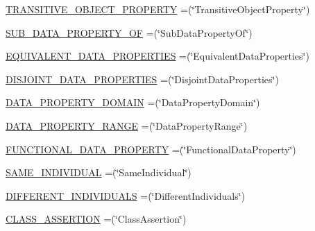 \begin{DoxyCompactItemize}
\item 
\hyperlink{enumorg_1_1semanticweb_1_1owlapi_1_1vocab_1_1_o_w_l_x_m_l_vocabulary_a2c41d3b22186357fbcd0229d60c0757b}{T\-R\-A\-N\-S\-I\-T\-I\-V\-E\-\_\-\-O\-B\-J\-E\-C\-T\-\_\-\-P\-R\-O\-P\-E\-R\-T\-Y} =(\char`\"{}Transitive\-Object\-Property\char`\"{})
\item 
\hyperlink{enumorg_1_1semanticweb_1_1owlapi_1_1vocab_1_1_o_w_l_x_m_l_vocabulary_a56ee089c75f10ee6b5b2cfedaa2bd508}{S\-U\-B\-\_\-\-D\-A\-T\-A\-\_\-\-P\-R\-O\-P\-E\-R\-T\-Y\-\_\-\-O\-F} =(\char`\"{}Sub\-Data\-Property\-Of\char`\"{})
\item 
\hyperlink{enumorg_1_1semanticweb_1_1owlapi_1_1vocab_1_1_o_w_l_x_m_l_vocabulary_a0b9029905e865207bd02f688fa38fe1b}{E\-Q\-U\-I\-V\-A\-L\-E\-N\-T\-\_\-\-D\-A\-T\-A\-\_\-\-P\-R\-O\-P\-E\-R\-T\-I\-E\-S} =(\char`\"{}Equivalent\-Data\-Properties\char`\"{})
\item 
\hyperlink{enumorg_1_1semanticweb_1_1owlapi_1_1vocab_1_1_o_w_l_x_m_l_vocabulary_a4c2e743ee1e358a0637e1cd8c3cdcd6f}{D\-I\-S\-J\-O\-I\-N\-T\-\_\-\-D\-A\-T\-A\-\_\-\-P\-R\-O\-P\-E\-R\-T\-I\-E\-S} =(\char`\"{}Disjoint\-Data\-Properties\char`\"{})
\item 
\hyperlink{enumorg_1_1semanticweb_1_1owlapi_1_1vocab_1_1_o_w_l_x_m_l_vocabulary_ad77199b5254ec7e6544e4acb75e96996}{D\-A\-T\-A\-\_\-\-P\-R\-O\-P\-E\-R\-T\-Y\-\_\-\-D\-O\-M\-A\-I\-N} =(\char`\"{}Data\-Property\-Domain\char`\"{})
\item 
\hyperlink{enumorg_1_1semanticweb_1_1owlapi_1_1vocab_1_1_o_w_l_x_m_l_vocabulary_a598a5ed924559b0e0123271ff14cc4b5}{D\-A\-T\-A\-\_\-\-P\-R\-O\-P\-E\-R\-T\-Y\-\_\-\-R\-A\-N\-G\-E} =(\char`\"{}Data\-Property\-Range\char`\"{})
\item 
\hyperlink{enumorg_1_1semanticweb_1_1owlapi_1_1vocab_1_1_o_w_l_x_m_l_vocabulary_ab545514ae7171f393d76f7217dfc184b}{F\-U\-N\-C\-T\-I\-O\-N\-A\-L\-\_\-\-D\-A\-T\-A\-\_\-\-P\-R\-O\-P\-E\-R\-T\-Y} =(\char`\"{}Functional\-Data\-Property\char`\"{})
\item 
\hyperlink{enumorg_1_1semanticweb_1_1owlapi_1_1vocab_1_1_o_w_l_x_m_l_vocabulary_a137b0279e4071e6e42038deb9af01dda}{S\-A\-M\-E\-\_\-\-I\-N\-D\-I\-V\-I\-D\-U\-A\-L} =(\char`\"{}Same\-Individual\char`\"{})
\item 
\hyperlink{enumorg_1_1semanticweb_1_1owlapi_1_1vocab_1_1_o_w_l_x_m_l_vocabulary_a6dc1bc66d49c08a3375152b05df40456}{D\-I\-F\-F\-E\-R\-E\-N\-T\-\_\-\-I\-N\-D\-I\-V\-I\-D\-U\-A\-L\-S} =(\char`\"{}Different\-Individuals\char`\"{})
\item 
\hyperlink{enumorg_1_1semanticweb_1_1owlapi_1_1vocab_1_1_o_w_l_x_m_l_vocabulary_a8ec54b776ef4899f07dba36b150a19b5}{C\-L\-A\-S\-S\-\_\-\-A\-S\-S\-E\-R\-T\-I\-O\-N} =(\char`\"{}Class\-Assertion\char`\"{})

\end{DoxyCompactItemize}
